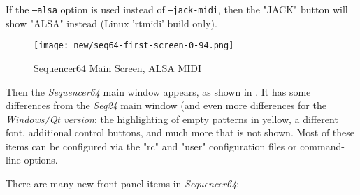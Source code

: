 \documentclass[
 11pt,
 twoside,
 a4paper,
 headinclude,
 footinclude,
 final                                 %
]{article}
\begin{document}
   If the \texttt{--alsa} option is used instead of
   \texttt{--jack-midi}, then the "JACK" button will show "ALSA" instead
   (Linux 'rtmidi' build only).

\begin{figure}[H]
   \centering 
   \texttt{[image: new/seq64-first-screen-0-94.png]}
   \caption{Sequencer64 Main Screen, ALSA MIDI}
   \label{fig:seq64_main_screen}
\end{figure}

   Then the \textsl{Sequencer64} main window appears, as shown in
   .
   It has some differences from the \textsl{Seq24} main window
   (and even more differences for the \textsl{Windows/Qt version}:
   the highlighting of
   empty patterns in yellow, a different font, additional control buttons,
   and much more that is not shown.
   Most of these items can be configured via the "rc" and "user" configuration
   files or command-line options.

   There are many new front-panel items in \textsl{Sequencer64}:
\end{document}
